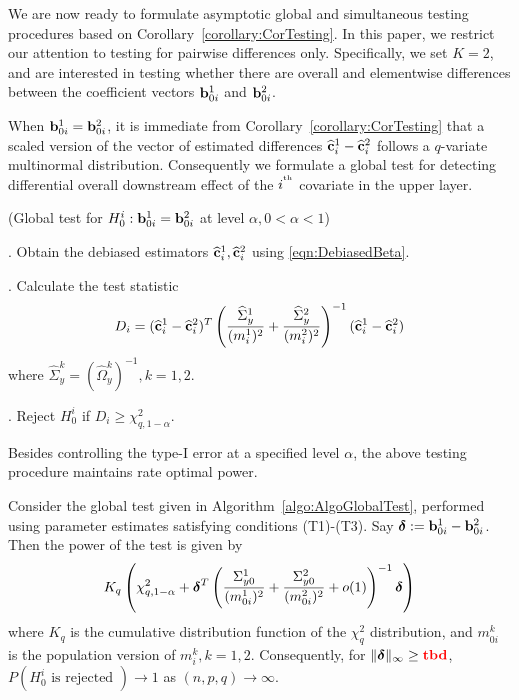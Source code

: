 We are now ready to formulate asymptotic global and simultaneous testing procedures based on Corollary~\ref{corollary:CorTesting}. In this paper, we restrict our attention to testing for pairwise differences only. Specifically, we set $K=2$, and are interested in testing whether there are overall and elementwise differences between the coefficient vectors ${\bf{b}}_{0i}^1$ and ${\bf{b}}_{0i}^2$.

When ${\bf{b}}_{0 i}^1 = {\bf{b}}_{0 i}^2$, it is immediate from Corollary~\ref{corollary:CorTesting} that a scaled version of the vector of estimated differences $\widehat {{\bf{c}}}_i^1 - \widehat {{\bf{c}}}_i^2$ follows a $q$-variate multinormal distribution. Consequently we formulate a global test for detecting differential overall downstream effect of the $i^{\operatorname*{^{\text{th}}}}$ covariate in the upper layer.

\begin{Algorithm}\label{algo:AlgoGlobalTest}
(Global test for $H_0^i: {\bf{b}}_{0 i}^1 = {\bf{b}}_{0 i}^2$ at level $\alpha, 0< \alpha< 1$)

. Obtain the debiased estimators $\widehat {{\bf{c}}}_i^1, \widehat {{\bf{c}}}_i^2$ using \eqref{eqn:DebiasedBeta}.

. Calculate the test statistic
%
$$
D_i = (\widehat {{\bf{c}}}_i^1 - \widehat {{\bf{c}}}_i^2)^T
\left( \frac{ \widehat \Sigma_y^1}{(m_i^1)^2} +
\frac{\widehat \Sigma_y^2}{(m_i^2)^2} \right)^{-1} (\widehat {{\bf{c}}}_i^1 - \widehat {{\bf{c}}}_i^2)
$$
%
where $\widehat \Sigma_y^k = (\widehat \Omega_y^k)^{-1}, k = 1,2$.

. Reject $H_0^i$ if $D_i \geq \chi^2_{q, 1-\alpha}$.
\end{Algorithm}

Besides controlling the type-I error at a specified level $\alpha$, the above testing procedure maintains rate optimal power.

\begin{Theorem}
Consider the global test given in Algorithm~\ref{algo:AlgoGlobalTest}, performed using parameter estimates satisfying conditions (T1)-(T3). Say ${\boldsymbol{\delta}} := {\bf{b}}_{0 i}^1 - {\bf{b}}_{0 i}^2$. Then the power of the test is given by
%
$$
K_q \left( \chi^2_{q,1-\alpha} + {\boldsymbol{\delta}}^T 
\left( \frac{ \Sigma_{y 0}^1}{(m_{0 i}^1)^2} + \frac{\Sigma_{y 0}^2}{(m_{0 i}^2)^2}
+ o(1) \right)^{-1} {\boldsymbol{\delta}} \right)
$$
%
where $K_q$ is the cumulative distribution function of the $\chi^2_q$ distribution, and $m_{0 i}^k$ is the population version of $m_i^k, k=  1,2$. Consequently, for $\| {\boldsymbol{\delta}} \|_\infty \geq {\color{red} \bf tbd}$, $P( H_0^i \text{ is rejected }) \rightarrow 1$ as $(n,p,q) \rightarrow \infty$.
\end{Theorem}
%

